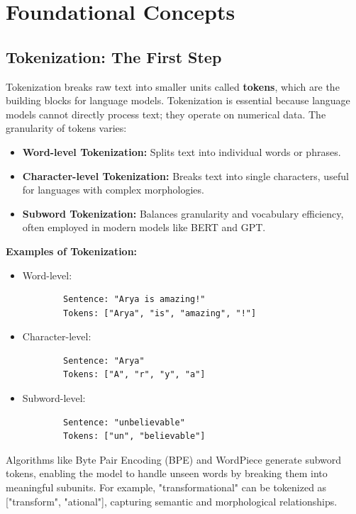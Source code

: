 \section{Foundational Concepts}
\subsection{Tokenization: The First Step}
\begin{flushleft}
    \large Tokenization breaks raw text into smaller units called \textbf{tokens}, which are the building blocks for language models. Tokenization is essential because language models cannot directly process text; they operate on numerical data. The granularity of tokens varies:
    \begin{itemize}
        \item \textbf{Word-level Tokenization:} Splits text into individual words or phrases.
        \item \textbf{Character-level Tokenization:} Breaks text into single characters, useful for languages with complex morphologies.
        \item \textbf{Subword Tokenization:} Balances granularity and vocabulary efficiency, often employed in modern models like BERT and GPT.
    \end{itemize}

\textbf{Examples of Tokenization:}
    \begin{itemize}
        \item Word-level:
        \begin{verbatim}
        Sentence: "Arya is amazing!"
        Tokens: ["Arya", "is", "amazing", "!"]
        \end{verbatim}
        \item Character-level:
        \begin{verbatim}
        Sentence: "Arya"
        Tokens: ["A", "r", "y", "a"]
        \end{verbatim}
        \item Subword-level:
        \begin{verbatim}
        Sentence: "unbelievable"
        Tokens: ["un", "believable"]
        \end{verbatim}
    \end{itemize}

    Algorithms like Byte Pair Encoding (BPE) and WordPiece generate subword tokens, enabling the model to handle unseen words by breaking them into meaningful subunits. For example, "transformational" can be tokenized as ["transform", "ational"], capturing semantic and morphological relationships.
\end{flushleft}

